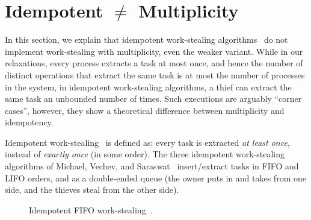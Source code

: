 \section{\label{sec-idem-neq-mult}Idempotent \(\neq\) Multiplicity}

In this section, we explain that idempotent work-stealing algorithms~\cite{maged.vechev.2009} do not implement work-stealing with multiplicity, even the weaker variant.  While in our relaxations, every process extracts a task at most once, and hence the number of distinct operations that extract the same task is at most the number of processes in the system, in idempotent work-stealing algorithms, a thief can extract the same task an unbounded number of times.  Such executions are arguably ``corner cases'', however, they show a theoretical difference between multiplicity and idempotency.

Idempotent work-stealing~\cite{maged.vechev.2009} is defined as: every task is extracted \emph{at least once}, instead of \emph{exactly once} (in some order).  The three idempotent work-stealing algorithms of Michael, Vechev, and Saraswat~\cite{maged.vechev.2009} insert/extract tasks in FIFO and LIFO orders, and as a double-ended queue (the owner puts in and takes from one side, and the thieves steal from the other side).

\begin{figure}
    \caption{\label{fig-idempotent-fifo}Idempotent FIFO work-stealing~\cite{maged.vechev.2009}.}
\end{figure}

